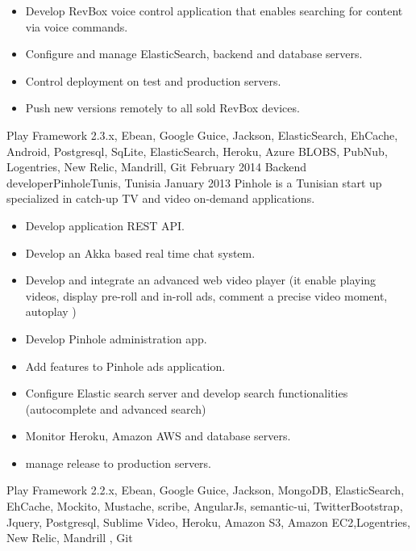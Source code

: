 \begin{experiences}
{\begin{itemize}
                        \item Develop RevBox voice control application that enables searching for content via voice commands.
                        \item Configure and manage ElasticSearch, backend and database servers.
                        \item Control deployment on test and production servers.
                        \item Push new versions remotely to all sold RevBox devices.
                      \end{itemize}
                    }
                    { Play Framework 2.3.x, Ebean, Google Guice, Jackson, ElasticSearch, EhCache, Android, Postgresql, SqLite, ElasticSearch, Heroku, Azure BLOBS, PubNub, Logentries, New Relic, Mandrill, Git}
  \emptySeparator
  \experience
    {February 2014}   {Backend developer}{Pinhole}{Tunis, Tunisia}
    {January 2013} {Pinhole is a Tunisian start up specialized in catch-up TV and video on-demand applications.}
                    {
                      \begin{itemize}
                        \item Develop application REST API.
                        \item Develop an Akka based real time chat system.
                        \item Develop and integrate an advanced web video player (it enable playing videos, display pre-roll and in-roll ads, comment a precise video moment, autoplay )
                        \item Develop Pinhole administration app.
                        \item Add features to Pinhole ads application.
                        \item Configure Elastic search server and develop search functionalities (autocomplete and advanced search)
                        \item Monitor Heroku, Amazon AWS and database servers.
                        \item manage release to production servers.
                      \end{itemize}
                    }
                    {Play Framework 2.2.x, Ebean, Google Guice, Jackson, MongoDB, ElasticSearch, EhCache, Mockito, Mustache, scribe, AngularJs, semantic-ui, TwitterBootstrap, Jquery, Postgresql, Sublime Video, Heroku, Amazon S3, Amazon EC2,Logentries, New Relic, Mandrill , Git}

\end{experiences}
